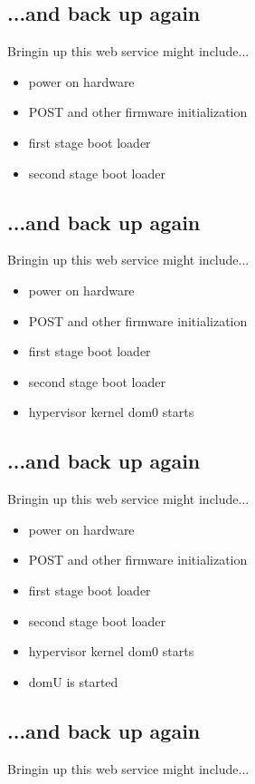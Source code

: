 \documentclass[xga]{xdvislides}
\begin{document}
\subsection{...and back up again}
Bringin up this web service might include...
\\

\begin{itemize}
	\item power on hardware
	\item POST and other firmware initialization
	\item first stage boot loader
	\item second stage boot loader
\end{itemize}

\subsection{...and back up again}
Bringin up this web service might include...
\\

\begin{itemize}
	\item power on hardware
	\item POST and other firmware initialization
	\item first stage boot loader
	\item second stage boot loader
	\item hypervisor kernel dom0 starts
\end{itemize}

\subsection{...and back up again}
Bringin up this web service might include...
\\

\begin{itemize}
	\item power on hardware
	\item POST and other firmware initialization
	\item first stage boot loader
	\item second stage boot loader
	\item hypervisor kernel dom0 starts
	\item domU is started
\end{itemize}

\subsection{...and back up again}
Bringin up this web service might include...
\\
\end{document}
